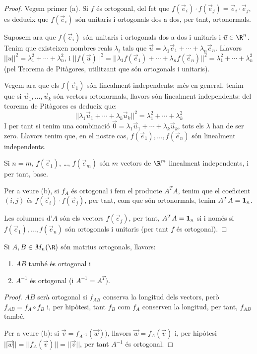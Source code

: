 \begin{proof}
Vegem primer (a). Si $f$ és ortogonal, del fet que $f(\vec e_i)\cdot f(\vec e_j)=\vec e_i\cdot \vec e_j$, es dedueix que $f(\vec e_i)$ són unitaris i ortogonals dos a dos, per tant, ortonormals.

Suposem ara que $f(\vec e_i)$ són unitaris i ortogonals dos a dos i unitaris i $\vec u \in \R^n$. Tenim que existeixen nombres reals $\lambda_i$ tals que $\vec u= \lambda_1\vec e_1+ \cdots + \lambda_n\vec e_n$. Llavors $||u||^2=\lambda_1^2+ \cdots + \lambda_n^2$, i $||f(\vec u)||^2=||\lambda_1 f(\vec e_1)+\cdots + \lambda_n f(\vec e_n)||^2=\lambda_1^2+ \cdots + \lambda_n^2$ (pel Teorema de Pitàgores, utilitzant que són ortogonals i unitaris). 

Vegem ara que els $f(\vec e_1)$ són linealment independents: més en general, tenim que si $\vec u_1, \dots, \vec u_k$ són vectors ortonormals, llavors són linealment independents: del teorema de Pitàgores es dedueix que:
\[
||\lambda_1\vec u_1 + \cdots + \lambda_k \vec u_k||^2=\lambda_1^2 + \cdots + \lambda_k^2
\]
I per tant si tenim una combinació $\vec 0 = \lambda_1\vec u_1 + \cdots + \lambda_k \vec u_k$, tots els $\lambda$ han de ser zero. Llavors tenim que, en el nostre cas, $f(\vec e_1), \dots, f(\vec e_n)$ són linealment independents.

Si $n=m$, $f(\vec e_1)$, \ldots, $f(\vec e_m)$ són $m$ vectors de $\R^m$ linealment independents, i per tant, base.

Per a veure (b), si $f_A$ és ortogonal i fem el producte $A^TA$, tenim que el coeficient $(i,j)$ és $f(\vec e_i)\cdot f(\vec e_j)$, per tant, com que són ortonormals, tenim $A^TA=\mathbf{1}_n$.

Les columnes d'$A$ són els vectors $f(\vec e_j)$, per tant, $A^TA=\mathbf{1}_n$ si i només si  $f(\vec e_1), \dots, f(\vec e_n)$ són ortogonals i unitaris (per tant $f$ és ortogonal).
\end{proof}
\begin{teorema}
Si $A,B \in M_n(\R)$ són matrius ortogonals, llavors:
\begin{enumerate}[\rm (a)]
    \item $AB$ també és ortogonal i
    \item $A^{-1}$ és ortogonal (i $A^{-1}=A^T)$.
\end{enumerate}
\end{teorema}
\begin{proof}
$AB$ serà ortogonal si $f_{AB}$ conserva la longitud dels vectors, però $f_{AB}=f_A \circ f_B$ i, per hipòtesi, tant $f_B$ com $f_A$ conserven la longitud, per tant, $f_{AB}$ també.

Per a veure (b): si $\vec v = f_{A^{-1}}(\vec w))$, llavors $\vec w=f_A(\vec v)$ i, per hipòtesi $||\vec w||=||f_A(\vec v)||=||\vec v||$, per tant $A^{-1}$ és ortogonal. 
\end{proof}

